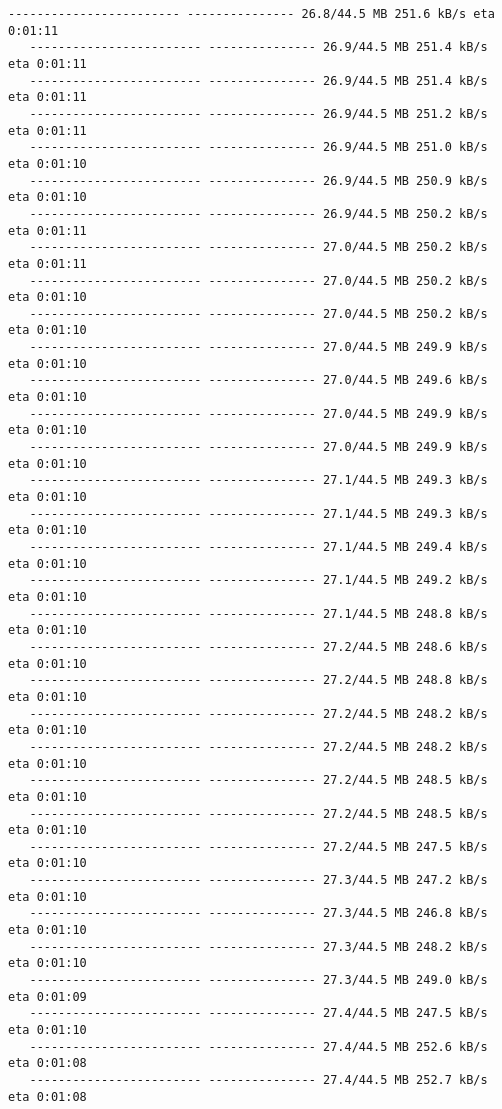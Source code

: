 \documentclass[11pt]{article}
\begin{document}
\begin{Verbatim}[commandchars=\\\{\}]
   ------------------------ --------------- 26.8/44.5 MB 251.6 kB/s eta 0:01:11
   ------------------------ --------------- 26.9/44.5 MB 251.4 kB/s eta 0:01:11
   ------------------------ --------------- 26.9/44.5 MB 251.4 kB/s eta 0:01:11
   ------------------------ --------------- 26.9/44.5 MB 251.2 kB/s eta 0:01:11
   ------------------------ --------------- 26.9/44.5 MB 251.0 kB/s eta 0:01:10
   ------------------------ --------------- 26.9/44.5 MB 250.9 kB/s eta 0:01:10
   ------------------------ --------------- 26.9/44.5 MB 250.2 kB/s eta 0:01:11
   ------------------------ --------------- 27.0/44.5 MB 250.2 kB/s eta 0:01:11
   ------------------------ --------------- 27.0/44.5 MB 250.2 kB/s eta 0:01:10
   ------------------------ --------------- 27.0/44.5 MB 250.2 kB/s eta 0:01:10
   ------------------------ --------------- 27.0/44.5 MB 249.9 kB/s eta 0:01:10
   ------------------------ --------------- 27.0/44.5 MB 249.6 kB/s eta 0:01:10
   ------------------------ --------------- 27.0/44.5 MB 249.9 kB/s eta 0:01:10
   ------------------------ --------------- 27.0/44.5 MB 249.9 kB/s eta 0:01:10
   ------------------------ --------------- 27.1/44.5 MB 249.3 kB/s eta 0:01:10
   ------------------------ --------------- 27.1/44.5 MB 249.3 kB/s eta 0:01:10
   ------------------------ --------------- 27.1/44.5 MB 249.4 kB/s eta 0:01:10
   ------------------------ --------------- 27.1/44.5 MB 249.2 kB/s eta 0:01:10
   ------------------------ --------------- 27.1/44.5 MB 248.8 kB/s eta 0:01:10
   ------------------------ --------------- 27.2/44.5 MB 248.6 kB/s eta 0:01:10
   ------------------------ --------------- 27.2/44.5 MB 248.8 kB/s eta 0:01:10
   ------------------------ --------------- 27.2/44.5 MB 248.2 kB/s eta 0:01:10
   ------------------------ --------------- 27.2/44.5 MB 248.2 kB/s eta 0:01:10
   ------------------------ --------------- 27.2/44.5 MB 248.5 kB/s eta 0:01:10
   ------------------------ --------------- 27.2/44.5 MB 248.5 kB/s eta 0:01:10
   ------------------------ --------------- 27.2/44.5 MB 247.5 kB/s eta 0:01:10
   ------------------------ --------------- 27.3/44.5 MB 247.2 kB/s eta 0:01:10
   ------------------------ --------------- 27.3/44.5 MB 246.8 kB/s eta 0:01:10
   ------------------------ --------------- 27.3/44.5 MB 248.2 kB/s eta 0:01:10
   ------------------------ --------------- 27.3/44.5 MB 249.0 kB/s eta 0:01:09
   ------------------------ --------------- 27.4/44.5 MB 247.5 kB/s eta 0:01:10
   ------------------------ --------------- 27.4/44.5 MB 252.6 kB/s eta 0:01:08
   ------------------------ --------------- 27.4/44.5 MB 252.7 kB/s eta 0:01:08

\end{Verbatim}
\end{document}
